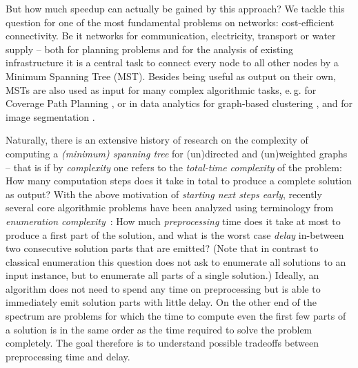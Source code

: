 \documentclass[a4paper, USenglish, cleveref, autoref, thm-restate]{lipics-v2021}
\begin{document}
But how much speedup can actually be gained by this approach?
We tackle this question for one of the most fundamental problems on networks: cost-efficient connectivity.
Be it networks for communication, electricity, transport or water supply -- both for planning problems and for the analysis of existing infrastructure it is a central task to connect every node to all other nodes by a Minimum Spanning Tree (MST).
Besides being useful as output on their own, MSTs are also used as input for many complex algorithmic tasks, e.\,g. for Coverage Path Planning \cite{tanComprehensiveReviewCoverage2021}, or in data analytics for graph-based clustering \cite{zahnGraphTheoreticalMethodsDetecting1971,gagolewskiClusteringMinimumSpanning2024}, and for image segmentation \cite{felzenszwalbEfficientGraphBasedImage2004}.

Naturally, there is an extensive history of research on the complexity of computing a \textit{(minimum) spanning tree} for (un)directed and (un)weighted graphs -- that is if by \textit{complexity} one refers to the \textit{total-time complexity} of the problem:
How many computation steps does it take in total to produce a complete solution as output?
With the above motivation of \textit{starting next steps early}, recently several core algorithmic problems have been analyzed using terminology from \textit{enumeration complexity}~\cite{strozeckiEnumerationComplexity2019}:
How much \textit{preprocessing} time does it take at most to produce a first part of the solution, and what is the worst case \textit{delay} in-between two consecutive solution parts that are emitted?
(Note that in contrast to classical enumeration this question does not ask to enumerate all solutions to an input instance, but to enumerate all parts of a single solution.)
Ideally, an algorithm does not need to spend any time on preprocessing but is able to immediately emit solution parts with little delay.
On the other end of the spectrum are problems for which the time to compute even the first few parts of a solution is in the same order as the time required to solve the problem completely.
The goal therefore is to understand possible tradeoffs between preprocessing time and delay.
\end{document}
